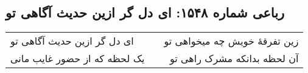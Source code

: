 \begin{center}
\section*{رباعی شماره ۱۵۴۸: ای دل گر ازین حدیث آگاهی تو}
\label{sec:1548}
\begin{longtable}{l p{0.5cm} r}
ای دل گر ازین حدیث آگاهی تو
&&
زین تفرقهٔ خویش چه میخواهی تو
\\
یک لحظه که از حضور غایب مانی
&&
آن لحظه بدانکه مشرک راهی تو
\\
\end{longtable}
\end{center}
